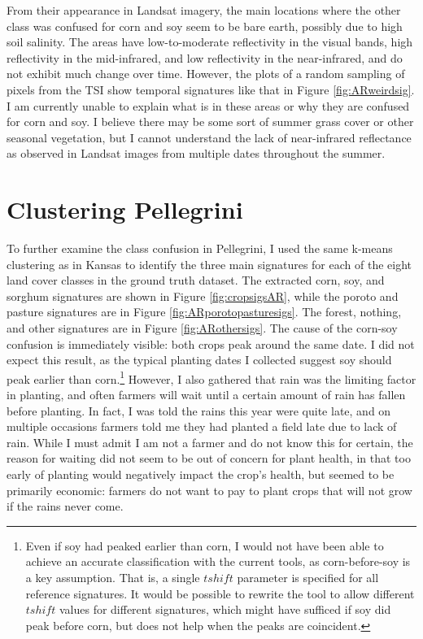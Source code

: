 From their appearance in Landsat imagery, the main locations where the other class was confused for corn and soy seem to be bare earth, possibly due to high soil salinity. The areas have low-to-moderate reflectivity in the visual bands, high reflectivity in the mid-infrared, and low reflectivity in the near-infrared, and do not exhibit much change over time. However, the plots of a random sampling of pixels from the TSI show temporal signatures like that in Figure \ref{fig:ARweirdsig}. I am currently unable to explain what is in these areas or why they are confused for corn and soy. I believe there may be some sort of summer grass cover or other seasonal vegetation, but I cannot understand the lack of near-infrared reflectance as observed in Landsat images from multiple dates throughout the summer.

\section{Clustering Pellegrini}

To further examine the class confusion in Pellegrini, I used the same k-means clustering as in Kansas to identify the three main signatures for each of the eight land cover classes in the ground truth dataset. The extracted corn, soy, and sorghum signatures are shown in Figure \ref{fig:cropsigsAR}, while the poroto and pasture signatures are in Figure \ref{fig:ARporotopasturesigs}. The forest, nothing, and other signatures are in Figure \ref{fig:ARothersigs}. The cause of the corn-soy confusion is immediately visible: both crops peak around the same date. I did not expect this result, as the typical planting dates I collected suggest soy should peak earlier than corn.\footnote{Even if soy had peaked earlier than corn, I would not have been able to achieve an accurate classification with the current tools, as corn-before-soy is a key assumption. That is, a single $tshift$ parameter is specified for all reference signatures. It would be possible to rewrite the tool to allow different $tshift$ values for different signatures, which might have sufficed if soy did peak before corn, but does not help when the peaks are coincident.} However, I also gathered that rain was the limiting factor in planting, and often farmers will wait until a certain amount of rain has fallen before planting. In fact, I was told the rains this year were quite late, and on multiple occasions farmers told me they had planted a field late due to lack of rain. While I must admit I am not a farmer and do not know this for certain, the reason for waiting did not seem to be out of concern for plant health, in that too early of planting would negatively impact the crop's health, but seemed to be primarily economic: farmers do not want to pay to plant crops that will not grow if the rains never come.


